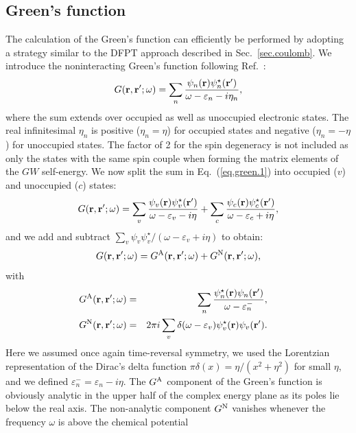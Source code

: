 \documentclass[twocolumn,prb,showpacs,superscriptaddress]{revtex4}
\def\w{\omega}
\def\E{\varepsilon}
\def\r{{\bf r}}
\def\rp{{\bf r^\prime}}
\begin{document}
\subsection{Green's function}\label{sec.green}

The calculation of the Green's function can efficiently be performed 
by adopting a strategy similar to the DFPT approach
described in Sec.\ \ref{sec.coulomb}.
We introduce the noninteracting Green's function following Ref.\ :
  \begin{equation}\label{eq.green.1}
  G(\r,\rp;\w) = \sum_n \frac{\psi_n(\r)\psi_n^\star(\rp)}{\w-\E_n-i\eta_n},
  \end{equation}
where the sum extends over occupied as well as unoccupied electronic states.
The real infinitesimal $\eta_n$ is positive ($\eta_n=\eta$) 
for occupied states and negative ($\eta_n=-\eta$) for unoccupied states.\cite{hl,hl86}
The factor of 2 for the spin degeneracy is not included
as only the states with the same spin couple when forming the 
matrix elements of the $GW$ self-energy.\cite{hl86}
We now split the sum in Eq.~(\ref{eq.green.1}) into occupied ($v$) and unoccupied ($c$) states:
  \begin{equation}\label{eq.green.2}
  G(\r,\rp;\w) = \sum_v \frac{\psi_v(\r)\psi_v^\star(\rp)}{\w-\E_v-i\eta}
  + \sum_c \frac{\psi_c(\r)\psi_c^\star(\rp)}{\w-\E_c+i\eta},
  \end{equation}
and we add and subtract $\sum_v \psi_v\psi_v^\star/(\w-\E_v+i\eta)$ to obtain:
  \begin{equation}\label{eq.green.split}
  G(\r,\rp;\w) = G^{\rm A}(\r,\rp;\w) + G^{\rm N}(\r,\rp;\w),
  \end{equation}
with
  \begin{eqnarray}\label{eq.green.split.2}
\!\!\!\!\!\!  G^{\rm A}(\r,\rp;\w) & =&  \sum_n \frac{\psi_n^\star(\r)\psi_n(\rp)}{\w-\E_n^-},  \\ 
\!\!\!\!\!\!  G^{\rm N}(\r,\rp;\w)  & = &  2\pi i \sum_v \delta(\w-\E_v) \psi_v^\star(\r)\psi_v(\rp). \label{eq.green.split.3} 
  \end{eqnarray}
Here we assumed once again time-reversal symmetry, we used the Lorentzian representation of the Dirac's delta function 
$\pi\delta(x)=\eta/(x^2+\eta^2)$ for small $\eta$, and we defined $\E_n^- = \E_n - i\eta$.
The $G^{\rm A}$ component of the Green's function is obviously analytic in the
upper half of the complex energy plane as its poles lie below the real axis.
The non-analytic component $G^{\rm N}$ vanishes
whenever the frequency $\w$ is above the chemical potential 
\end{document}
